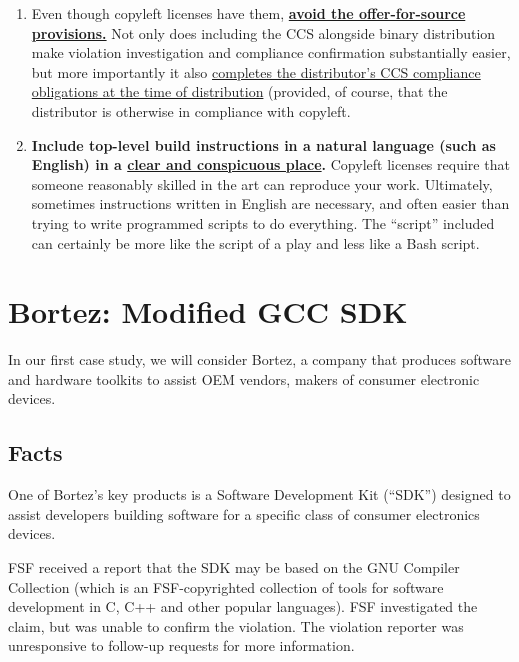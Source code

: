   
\begin{enumerate}

\item Even though copyleft licenses have them,
  \hyperref[thinkpenguin-included-ccs]{\bf avoid the offer-for-source
    provisions.}  Not only does including the CCS alongside binary
  distribution make violation investigation and compliance confirmation
  substantially easier, but more importantly it also
  \hyperref[offer-for-source]{completes the distributor's CCS compliance
    obligations at the time of distribution} (provided, of course, that the
  distributor is otherwise in compliance with copyleft.
  
\item {\bf Include top-level build instructions in a natural language (such
  as English) in a \hyperref[thinkpenguin-toplevel-readme]{clear and
    conspicuous place}.}  Copyleft licenses require that someone reasonably
  skilled in the art can reproduce your work.  Ultimately, sometimes
  instructions written in English are necessary, and often easier than trying
  to write programmed scripts to do everything.  The ``script'' included can
  certainly be more like the script of a play and less like a Bash script.

\end{enumerate}

\chapter{Bortez: Modified GCC SDK}

In our first case study, we will consider Bortez, a company that
produces software and hardware toolkits to assist OEM vendors, makers
of consumer electronic devices.

\section{Facts}

One of Bortez's key products is a Software Development Kit (``SDK'')
designed to assist developers building software for a specific class of
consumer electronics devices.

FSF received a report that the SDK may be based on the GNU Compiler
Collection (which is an FSF-copyrighted collection of tools for software
development in C, C++ and other popular languages). FSF investigated the
claim, but was unable to confirm the violation. The violation reporter
was unresponsive to follow-up requests for more information.


